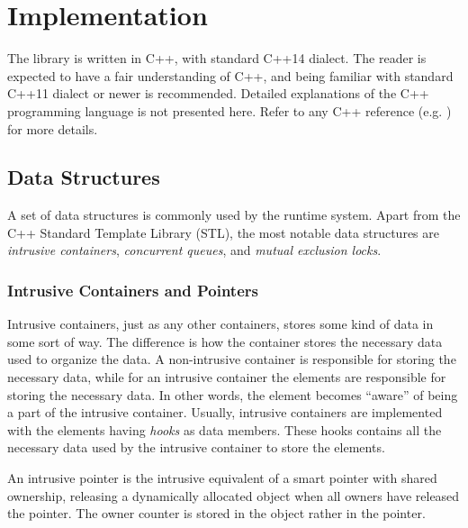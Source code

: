 

\chapter{Implementation}
\label{ch:implementation}


The library is written in C++, with standard C++14 dialect. The reader is expected to have a fair understanding of C++, and being familiar with standard C++11 dialect or newer is recommended. Detailed explanations of the C++ programming language is not presented here. Refer to any C++ reference (e.g. \citet{stroustrup2013c++}) for more details.


\section{Data Structures}
\label{sec:data_structures}


A set of data structures is commonly used by the runtime system. Apart from the C++ Standard Template Library (STL), the most notable data structures are \textit{intrusive containers}, \textit{concurrent queues}, and \textit{mutual exclusion locks}.


\subsection{Intrusive Containers and Pointers}


Intrusive containers, just as any other containers, stores some kind of data in some sort of way. The difference is how the container stores the necessary data used to organize the data. A non\hyp{}intrusive container is responsible for storing the necessary data, while for an intrusive container the elements are responsible for storing the necessary data. In other words, the element becomes ``aware'' of being a part of the intrusive container. Usually, intrusive containers are implemented with the elements having \textit{hooks} as data members. These hooks contains all the necessary data used by the intrusive container to store the elements. 

An intrusive pointer is the intrusive equivalent of a smart pointer with shared ownership, releasing a dynamically allocated object when all owners have released the pointer. The owner counter is stored in the object rather in the pointer.

